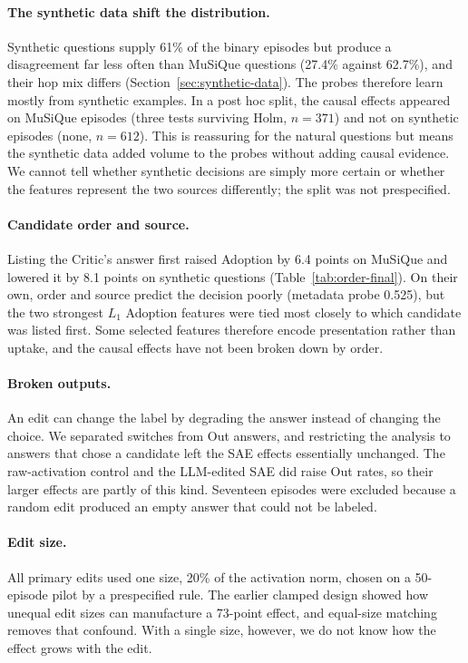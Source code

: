 \paragraph{The synthetic data shift the distribution.} Synthetic questions
supply 61\% of the binary episodes but produce a disagreement far less often
than MuSiQue questions (27.4\% against 62.7\%), and their hop mix differs
(Section~\ref{sec:synthetic-data}). The probes therefore learn mostly from
synthetic examples. In a post hoc split, the causal effects appeared on
MuSiQue episodes (three tests surviving Holm, $n = 371$) and not on synthetic
episodes (none, $n = 612$). This is reassuring for the natural questions but
means the synthetic data added volume to the probes without adding causal
evidence. We cannot tell whether synthetic decisions are simply more certain
or whether the features represent the two sources differently; the split was
not prespecified.

\paragraph{Candidate order and source.} Listing the Critic's answer first
raised Adoption by 6.4 points on MuSiQue and lowered it by 8.1 points on
synthetic questions (Table~\ref{tab:order-final}). On their own, order and
source predict the decision poorly (metadata probe 0.525), but the two
strongest $L_1$ Adoption features were tied most closely to which candidate
was listed first. Some selected features therefore encode presentation rather
than uptake, and the causal effects have not been broken down by order.

\paragraph{Broken outputs.} An edit can change the label by degrading the
answer instead of changing the choice. We separated switches from Out answers,
and restricting the analysis to answers that chose a candidate left the SAE
effects essentially unchanged. The raw-activation control and the LLM-edited
SAE did raise Out rates, so their larger effects are partly of this kind.
Seventeen episodes were excluded because a random edit produced an empty
answer that could not be labeled.

\paragraph{Edit size.} All primary edits used one size, 20\% of the activation
norm, chosen on a 50-episode pilot by a prespecified rule. The earlier clamped
design showed how unequal edit sizes can manufacture a 73-point effect, and
equal-size matching removes that confound. With a single size, however, we do
not know how the effect grows with the edit.

